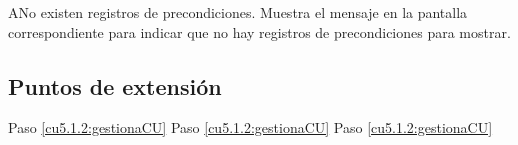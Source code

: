  \begin{UCtrayectoriaA}{A}{No existen registros de precondiciones.}
    \UCpaso[\UCsist] Muestra el mensaje  en la pantalla correspondiente
    para indicar que no hay registros de precondiciones para mostrar.
 \end{UCtrayectoriaA}
 

\subsection{Puntos de extensión}

	{Paso \ref{cu5.1.2:gestionaCU}}
	{}
	{Paso \ref{cu5.1.2:gestionaCU}}
	{}
	{Paso \ref{cu5.1.2:gestionaCU}}
	{}
  